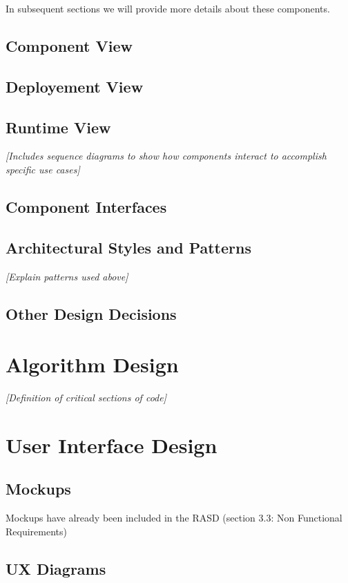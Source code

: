 \documentclass[11pt]{article} %
\begin{document}
In subsequent sections we will provide more details about these components.

\subsection{Component View}

\subsection{Deployement View}

\subsection{Runtime View}
	\textit{ [Includes sequence diagrams to show how components interact to accomplish specific use cases]}

\subsection{Component Interfaces}

\subsection{Architectural Styles and Patterns}
	\textit{ [Explain patterns used above]}

\subsection{Other Design Decisions}


\newpage
\section{Algorithm Design}
	\textit{ [Definition of critical sections of code] }


\newpage
\section{User Interface Design}

\subsection{Mockups}
Mockups have already been included in the RASD (section 3.3: Non Functional Requirements) 

\subsection{UX Diagrams}
\end{document}
